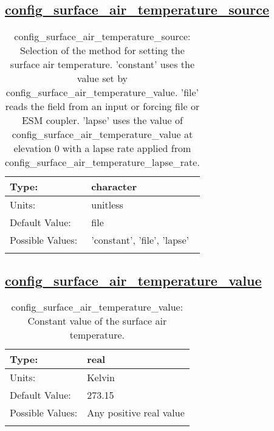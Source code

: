 \subsection[config\_surface\_air\_temperature\_source]{\hyperref[sec:nm_tab_thermal_solver]{config\_surface\_air\_temperature\_source}}
\label{subsec:nm_sec_config_surface_air_temperature_source}
\begin{center}
\begin{longtable}{| p{2.0in} || p{4.0in} |}
    \hline
    Type: & character \\
    \hline
    Units: & \si{unitless} \\
    \hline
    Default Value: & file \\
    \hline
    Possible Values: & 'constant', 'file', 'lapse' \\
    \hline
    \caption{config\_surface\_air\_temperature\_source: Selection of the method for setting the surface air temperature. 'constant' uses the value set by config\_surface\_air\_temperature\_value.  'file' reads the field from an input or forcing file or ESM coupler. 'lapse' uses the value of config\_surface\_air\_temperature\_value at elevation 0 with a lapse rate applied from config\_surface\_air\_temperature\_lapse\_rate.}
\end{longtable}
\end{center}
\subsection[config\_surface\_air\_temperature\_value]{\hyperref[sec:nm_tab_thermal_solver]{config\_surface\_air\_temperature\_value}}
\label{subsec:nm_sec_config_surface_air_temperature_value}
\begin{center}
\begin{longtable}{| p{2.0in} || p{4.0in} |}
    \hline
    Type: & real \\
    \hline
    Units: & \si{Kelvin} \\
    \hline
    Default Value: & 273.15 \\
    \hline
    Possible Values: & Any positive real value \\
    \hline
    \caption{config\_surface\_air\_temperature\_value: Constant value of the surface air temperature.}
\end{longtable}
\end{center}
